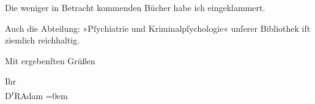 \pstart
           Die weniger in Betracht kommenden Bücher habe ich eingeklammert.\pend
           
\pstart
           Auch die Abteilung: »Pſychiatrie und Kriminalpſychologie« unſerer Bibliothek iſt ziemlich reichhaltig.\pend
           
\pstart
           Mit ergebenſten Grüßen\pend
           
\pstart
           Ihr{\\[\baselineskip]}\spacefill\mbox{D\textsuperscript{r}RAdam}\pend
           \leftskip=0em{}\endnumbering{}  
      